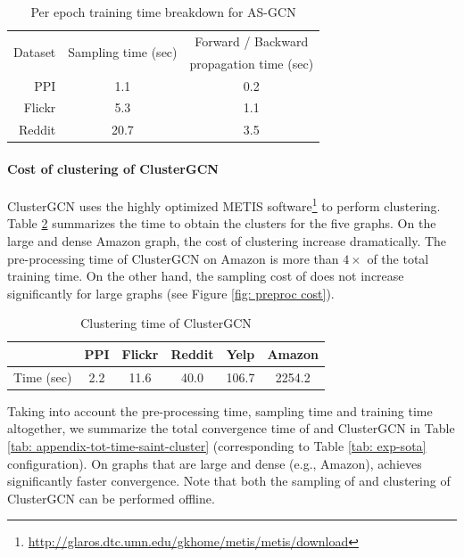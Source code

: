 \begin{table}[!ht]
\caption{Per epoch training time breakdown for AS-GCN}
    \centering
    \begin{tabular}{rcc}
        \toprule
        \multirow{2}{*}{Dataset} & \multirow{2}{*}{Sampling time (sec)} & {Forward / Backward}\\
        & & propagation time (sec)\\
        \midrule
        \midrule
        PPI & 1.1 & 0.2 \\
        Flickr & 5.3 & 1.1\\
        Reddit & 20.7 & 3.5 \\
        \bottomrule
    \end{tabular}%
    \label{tab: asgcn breakdown}
\end{table}


\paragraph{Cost of clustering of ClusterGCN}
ClusterGCN uses the highly optimized METIS software\footnote{\url{http://glaros.dtc.umn.edu/gkhome/metis/metis/download}} to perform clustering. Table \ref{tab: cluster cost} summarizes the time to obtain the clusters for the five graphs. On the large and dense Amazon graph, the cost of clustering increase dramatically. The pre-processing time of ClusterGCN on Amazon is more than $4\times$ of the total training time. On the other hand, the sampling cost of {\graphsaint} does not increase significantly for large graphs (see Figure \ref{fig: preproc cost}). 

\begin{table}[!ht]
\caption{Clustering time of ClusterGCN}
    \centering
    \begin{tabular}{rccccc}
        \toprule
        & PPI & Flickr & Reddit & Yelp & Amazon\\
        \midrule
        \midrule
        Time (sec) & 2.2 & 11.6 & 40.0 & 106.7 & 2254.2\\
        \bottomrule
    \end{tabular}%
    \label{tab: cluster cost}
\end{table}


Taking into account the pre-processing time, sampling time and training time altogether, we summarize the total convergence time of {\graphsaint} and ClusterGCN in Table \ref{tab: appendix-tot-time-saint-cluster} (corresponding to Table \ref{tab: exp-sota} configuration). 
On graphs that are large and dense (e.g., Amazon), {\graphsaint} achieves significantly faster convergence. 
Note that both the sampling of {\graphsaint} and clustering of ClusterGCN can be performed offline. 

